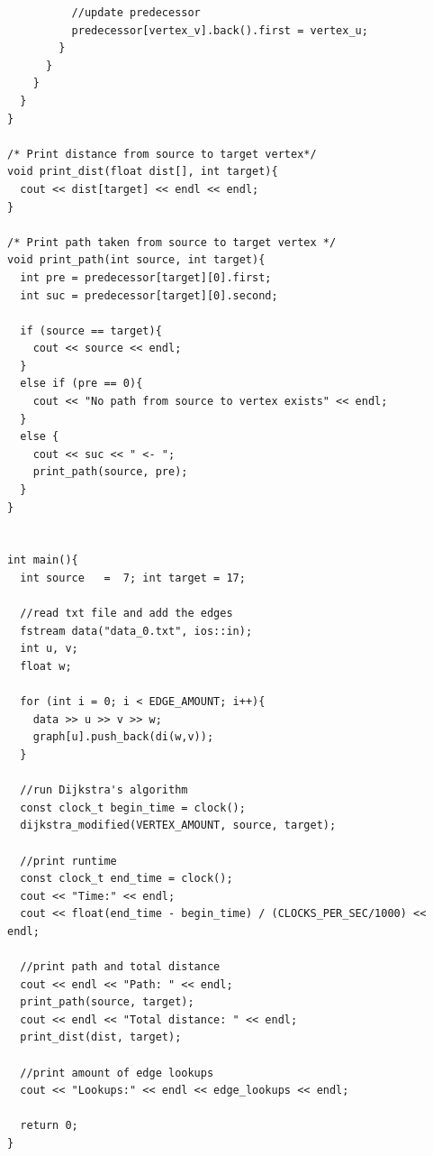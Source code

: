\documentclass[11pt]{article}
\begin{document}
\begin{lstlisting}
          //update predecessor		
          predecessor[vertex_v].back().first = vertex_u;
        }
      }
    }
  }
}

/* Print distance from source to target vertex*/
void print_dist(float dist[], int target){
  cout << dist[target] << endl << endl;
}

/* Print path taken from source to target vertex */
void print_path(int source, int target){
  int pre = predecessor[target][0].first;
  int suc = predecessor[target][0].second;

  if (source == target){
    cout << source << endl;
  }
  else if (pre == 0){
    cout << "No path from source to vertex exists" << endl;
  }
  else {
    cout << suc << " <- ";
    print_path(source, pre);
  }
}


int main(){
  int source   =  7; int target = 17;

  //read txt file and add the edges
  fstream data("data_0.txt", ios::in);
  int u, v;
  float w;

  for (int i = 0; i < EDGE_AMOUNT; i++){
    data >> u >> v >> w;
    graph[u].push_back(di(w,v));
  }

  //run Dijkstra's algorithm
  const clock_t begin_time = clock();
  dijkstra_modified(VERTEX_AMOUNT, source, target);

  //print runtime
  const clock_t end_time = clock();
  cout << "Time:" << endl;
  cout << float(end_time - begin_time) / (CLOCKS_PER_SEC/1000) << endl;

  //print path and total distance	
  cout << endl << "Path: " << endl;
  print_path(source, target);
  cout << endl << "Total distance: " << endl;
  print_dist(dist, target);

  //print amount of edge lookups
  cout << "Lookups:" << endl << edge_lookups << endl;
	
  return 0;
}
\end{lstlisting}
\ \\
\end{document}
